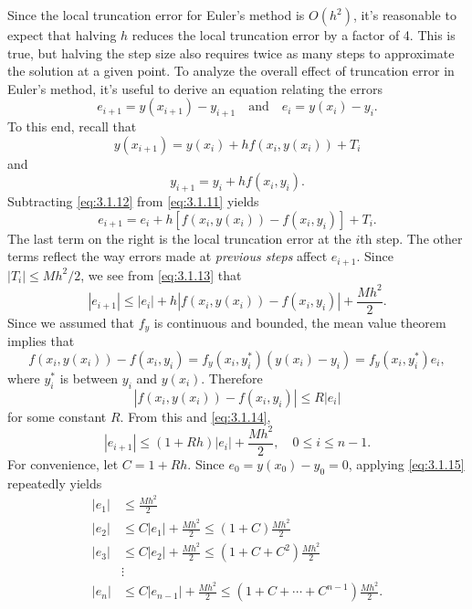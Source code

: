 Since the local truncation error for Euler's method is $O(h^2)$, it's
reasonable to expect that halving $h$ reduces the local truncation
error by a factor of 4. This is true, but
 halving the step size also requires twice as many steps to
approximate the solution at a given point. To analyze the overall
effect of truncation error in Euler's method, it's useful to  derive
an equation relating the errors
\[
e_{i+1}=y(x_{i+1})-y_{i+1}\quad\text{and}\quad e_i=y(x_i)-y_i.
\]
To this end, recall that
\begin{equation} \label{eq:3.1.11}
y(x_{i+1})=y(x_i)+hf(x_i,y(x_i))+T_i
\end{equation}
and
\begin{equation} \label{eq:3.1.12}
y_{i+1}=y_i+hf(x_i,y_i).
\end{equation}
Subtracting \eqref{eq:3.1.12} from \eqref{eq:3.1.11} yields
\begin{equation} \label{eq:3.1.13}
e_{i+1}=e_i+h\left[f(x_i,y(x_i))-f(x_i,y_i)\right]+T_i.
\end{equation}
The last term on the right is the local truncation error at the $i$th
step. The other terms reflect the way errors made at \emph{\color{blue}previous
steps} affect $e_{i+1}$. Since $|T_i|\le Mh^2/2$, we see from
\eqref{eq:3.1.13} that
\begin{equation} \label{eq:3.1.14}
|e_{i+1}|\le |e_i|+h|f(x_i,y(x_i))-f(x_i,y_i)|+\frac{Mh^2}{2}.
\end{equation}
Since we assumed that $f_y$ is continuous and bounded, the mean
value theorem implies that
\[
f(x_i,y(x_i))-f(x_i,y_i)=f_y(x_i,y_i^*)(y(x_i)-y_i)=f_y(x_i,y_i^*)e_i,
\]
where $y_i^*$ is between $y_i$ and $y(x_i)$. Therefore
\[
|f(x_i,y(x_i))-f(x_i,y_i)|\le R|e_i|
\]
for some constant $R$. From this and \eqref{eq:3.1.14},
\begin{equation} \label{eq:3.1.15}
|e_{i+1}|\le (1+Rh)|e_i|+\frac{Mh^2}{2},\quad 0\le i\le n-1.
\end{equation}
For convenience, let $C=1+Rh$. Since $e_0=y(x_0)-y_0=0$, applying
\eqref{eq:3.1.15} repeatedly yields
\begin{align}
|e_1| & \le \frac{Mh^2}{2}\nonumber\\
|e_2| & \le C|e_1|+\frac{Mh^2}{2}\le(1+C)\frac{Mh^2}{2}\nonumber\\
|e_3| & \le C|e_2|+\frac{Mh^2}{2}\le(1+C+C^2)\frac{Mh^2}{2}\nonumber\\
      & \vdots\nonumber \\
|e_n| & \le C|e_{n-1}|+\frac{Mh^2}{2}\le(1+C+\cdots+C^{n-1})\frac{Mh^2}{2}.
\label{eq:3.1.16}
\end{align}

